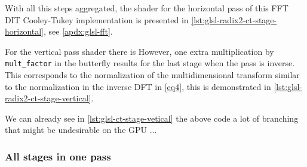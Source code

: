 \documentclass[
  oneside,
  11pt, a4paper,
  footinclude=true,
  headinclude=true,
  cleardoublepage=empty
]{scrbook}
\begin{document}






With all this steps aggregated, the shader for the horizontal pass of this FFT DIT Cooley-Tukey implementation is presented in \autoref{lst:glsl-radix2-ct-stage-horizontal}, see \autoref{apdx:glsl-fft}.


For the vertical pass shader there is However, one extra multiplication by \texttt{mult\_factor} in the butterfly results for the last stage when the pass is inverse. This corresponds to the normalization of the multidimensional transform similar to the normalization in the inverse DFT in \autoref{eq4}, this is demonstrated in \autoref{lst:glsl-radix2-ct-stage-vertical}.

We can already see in \autoref{lst:glsl-ct-stage-vetical} the above code a lot of branching that might be undesirable on the GPU  ... %

\subsubsection{All stages in one pass} \label{subsec:all-stages-in-one-pass}
\end{document}
